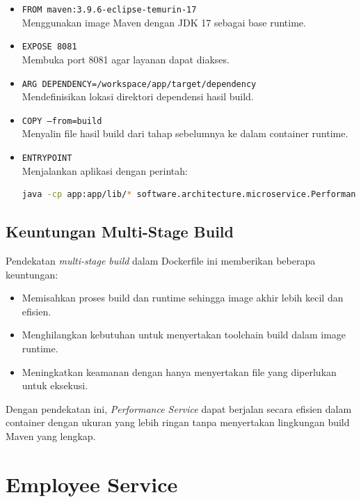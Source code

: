 \begin{itemize}
	\item \texttt{FROM maven:3.9.6-eclipse-temurin-17} \\
	Menggunakan image Maven dengan JDK 17 sebagai base runtime.
	\item \texttt{EXPOSE 8081} \\
	Membuka port 8081 agar layanan dapat diakses.
	\item \texttt{ARG DEPENDENCY=/workspace/app/target/dependency} \\
	Mendefinisikan lokasi direktori dependensi hasil build.
	\item \texttt{COPY --from=build} \\
	Menyalin file hasil build dari tahap sebelumnya ke dalam container runtime.
	\item \texttt{ENTRYPOINT} \\
	Menjalankan aplikasi dengan perintah:
	\begin{lstlisting}[language=bash]
		java -cp app:app/lib/* software.architecture.microservice.PerformanceServiceApplication
	\end{lstlisting}
\end{itemize}

\subsection{Keuntungan Multi-Stage Build}

Pendekatan \textit{multi-stage build} dalam Dockerfile ini memberikan beberapa keuntungan:
\begin{itemize}
	\item Memisahkan proses build dan runtime sehingga image akhir lebih kecil dan efisien.
	\item Menghilangkan kebutuhan untuk menyertakan toolchain build dalam image runtime.
	\item Meningkatkan keamanan dengan hanya menyertakan file yang diperlukan untuk eksekusi.
\end{itemize}

Dengan pendekatan ini, \textit{Performance Service} dapat berjalan secara efisien dalam container dengan ukuran yang lebih ringan tanpa menyertakan lingkungan build Maven yang lengkap.


\section{Employee Service}

